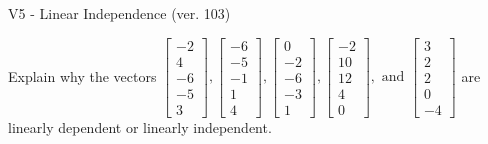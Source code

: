 \begin{exercise}
  \begin{exerciseTitle}V5 - Linear Independence (ver. 103)\end{exerciseTitle}
  \begin{exerciseStatement}
    Explain why the vectors \(\left[\begin{array}{r}
-2 \\
4 \\
-6 \\
-5 \\
3
\end{array}\right] , \left[\begin{array}{r}
-6 \\
-5 \\
-1 \\
1 \\
4
\end{array}\right] , \left[\begin{array}{r}
0 \\
-2 \\
-6 \\
-3 \\
1
\end{array}\right] , \left[\begin{array}{r}
-2 \\
10 \\
12 \\
4 \\
0
\end{array}\right] , \text{ and } \left[\begin{array}{r}
3 \\
2 \\
2 \\
0 \\
-4
\end{array}\right]\) are linearly dependent or linearly independent.	



\end{exerciseStatement}
\end{exercise}
